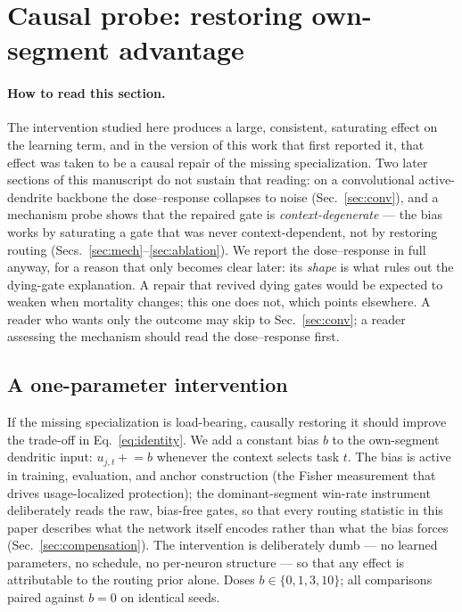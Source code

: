 \documentclass[10pt]{article}
\begin{document}


\section{Causal probe: restoring own-segment advantage}
\label{sec:causal}

\paragraph{How to read this section.} The intervention studied here
produces a large, consistent, saturating effect on the learning term, and
in the version of this work that first reported it, that effect was taken
to be a causal repair of the missing specialization. Two later sections
of this manuscript do not sustain that reading: on a convolutional
active-dendrite backbone the dose--response collapses to noise
(Sec.~\ref{sec:conv}), and a mechanism probe shows that the repaired gate
is \emph{context-degenerate} --- the bias works by saturating a gate that
was never context-dependent, not by restoring routing
(Secs.~\ref{sec:mech}--\ref{sec:ablation}). We report the dose--response
in full anyway, for a reason that only becomes clear later: its
\emph{shape} is what rules out the dying-gate explanation. A repair that
revived dying gates would be expected to weaken when mortality changes;
this one does not, which points elsewhere. A reader who wants only the
outcome may skip to Sec.~\ref{sec:conv}; a reader assessing the mechanism
should read the dose--response first.

\subsection{A one-parameter intervention}

If the missing specialization is load-bearing, causally restoring it should
improve the trade-off in Eq.~\eqref{eq:identity}. We add a constant bias $b$
to the own-segment dendritic input: $u_{j,t} \mathrel{+}= b$ whenever the
context selects task $t$. The bias is active in training, evaluation, and
anchor construction (the Fisher measurement that drives usage-localized
protection); the dominant-segment win-rate instrument deliberately reads
the raw, bias-free gates, so that every routing statistic in this paper
describes what the network itself encodes rather than what the bias
forces (Sec.~\ref{sec:compensation}). The intervention is deliberately
dumb --- no learned parameters, no schedule, no per-neuron structure ---
so that any effect is attributable to the routing prior alone. Doses
$b \in \{0, 1, 3, 10\}$; all comparisons paired against $b{=}0$ on
identical seeds.
\end{document}
